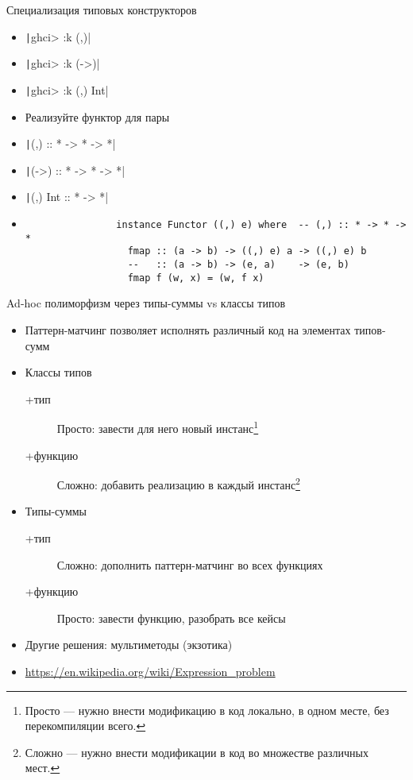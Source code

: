     \begin{frame}[fragile]{Специализация типовых конструкторов}
        \begin{itemize}
            \item[\todo] \texttt|ghci> :k (,)|
            \item[\todo] \texttt|ghci> :k (->)|
            \item[\todo] \texttt|ghci> :k (,) Int|
            \item[\todo] Реализуйте функтор для пары
            \item[\answer] \pause \texttt|(,) :: * -> * -> *|
            \item[\answer] \pause \texttt|(->) :: * -> * -> *|
            \item[\answer] \pause \texttt|(,) Int :: * -> *|
            \item[\answer] \pause
            \begin{verbatim}
                instance Functor ((,) e) where  -- (,) :: * -> * -> *
                  fmap :: (a -> b) -> ((,) e) a -> ((,) e) b
                  --   :: (a -> b) -> (e, a)    -> (e, b)
                  fmap f (w, x) = (w, f x)
            \end{verbatim}
        \end{itemize}
    \end{frame}


    \begin{frame}[fragile]{Ad-hoc полиморфизм через типы-суммы vs классы типов}
        \begin{itemize}
            \item Паттерн-матчинг позволяет исполнять различный код на элементах типов-сумм
            \item Классы типов
            \begin{description}
                \item[+тип] Просто: завести для него новый инстанс\footnote{Просто --- нужно внести модификацию в код локально, в одном месте, без перекомпиляции всего.}
                \item[+функцию] Сложно: добавить реализацию в каждый инстанс\footnote{Сложно --- нужно внести модификации в код во множестве различных мест.}
            \end{description}
            \item Типы-суммы
            \begin{description}
                \item[+тип] Сложно: дополнить паттерн-матчинг во всех функциях
                \item[+функцию] Просто: завести функцию, разобрать все кейсы
            \end{description}
            \item Другие решения: мультиметоды (экзотика)
            \item {\color{blue}\url{https://en.wikipedia.org/wiki/Expression\_problem}}
        \end{itemize}
    \end{frame}

